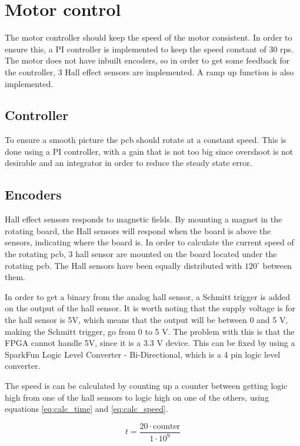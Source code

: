 \section{Motor control}
The motor controller should keep the speed of the motor consistent.
In order to ensure this, a PI controller is implemented to keep the speed constant of 30 rps.
The motor does not have inbuilt encoders, so in order to get some feedback for the controller, 3 Hall effect sensors are implemented.
A ramp up function is also implemented.

\subsection{Controller}

To ensure a smooth picture the pcb should rotate at a constant speed.
This is done using a PI controller, with a gain that is not too big since overshoot is not desirable and an integrator in order to reduce the steady state error.

\subsection{Encoders} \label{sec:encoders}

Hall effect sensors responds to magnetic fields.
By mounting a magnet in the rotating board, the Hall sensors will respond when the board is above the sensors, indicating where the board is.
In order to calculate the current speed of the rotating pcb, 3 hall sensor are mounted on the board located under the rotating pcb.
The Hall sensors have been equally distributed with $120^{\circ}$ between them.

In order to get a binary from the analog hall sensor, a Schmitt trigger\cite[p. 655]{book:prac_ele} is added on the output of the hall sensor.
It is worth noting that the supply voltage is for the hall sensor is 5V, which means that the output will be between 0 and 5 V, making the Schmitt trigger, go from 0 to 5 V.
The problem with this is that the FPGA cannot handle 5V, since it is a 3.3 V device.
This can be fixed by using a SparkFun Logic Level Converter - Bi-Directional, which is a 4 pin logic level converter. 

The speed is can be calculated by counting up a counter between getting logic high from one of the hall sensors to  logic high on one of the others, using equations  \ref{eq:calc_time} and \ref{eq:calc_speed}.

\begin{equation} \label{eq:calc_time}
 t = \frac{20\cdot \text{counter}}{1\cdot 10^9}
\end{equation}


